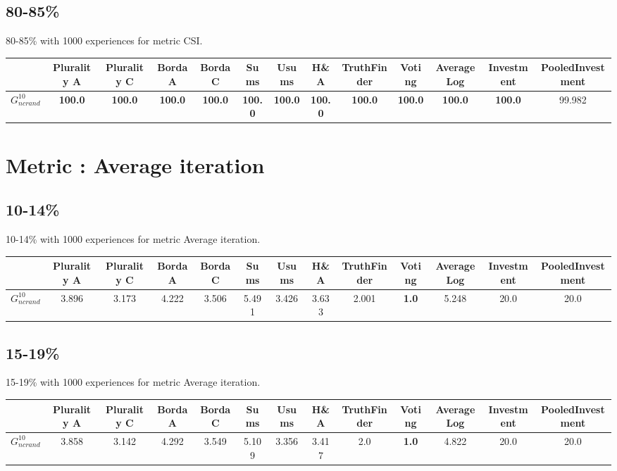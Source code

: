 \documentclass{article}
\newcommand{\graph}[2]{$G_{#1}^{#2}$}
\begin{document}
\subsection{80-85\%}

80-85\% with 1000 experiences for metric CSI.

\noindent\begin{tabular}{|l|c|c|c|c|c|c|c|c|c|c|c|c|}
\hline
& Plurality A& Plurality C& Borda A& Borda C& Sums& Usums& H\&A& TruthFinder& Voting& AverageLog& Investment& PooledInvestment\\
\hline
\graph{ncrand}{10} &\textbf{100.0}&\textbf{100.0}&\textbf{100.0}&\textbf{100.0}&\textbf{100.0}&\textbf{100.0}&\textbf{100.0}&\textbf{100.0}&\textbf{100.0}&\textbf{100.0}&\textbf{100.0}&99.982\\
\hline
\end{tabular}
\newpage
\newpage
\section{Metric : Average iteration}

\newpage

\subsection{10-14\%}

10-14\% with 1000 experiences for metric Average iteration.

\noindent\begin{tabular}{|l|c|c|c|c|c|c|c|c|c|c|c|c|}
\hline
& Plurality A& Plurality C& Borda A& Borda C& Sums& Usums& H\&A& TruthFinder& Voting& AverageLog& Investment& PooledInvestment\\
\hline
\graph{ncrand}{10} &3.896&3.173&4.222&3.506&5.491&3.426&3.633&2.001&\textbf{1.0}&5.248&20.0&20.0\\
\hline
\end{tabular}
\newpage

\subsection{15-19\%}

15-19\% with 1000 experiences for metric Average iteration.

\noindent\begin{tabular}{|l|c|c|c|c|c|c|c|c|c|c|c|c|}
\hline
& Plurality A& Plurality C& Borda A& Borda C& Sums& Usums& H\&A& TruthFinder& Voting& AverageLog& Investment& PooledInvestment\\
\hline
\graph{ncrand}{10} &3.858&3.142&4.292&3.549&5.109&3.356&3.417&2.0&\textbf{1.0}&4.822&20.0&20.0\\
\hline
\end{tabular}
\newpage
\end{document}
